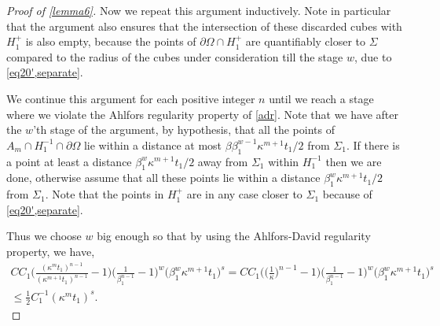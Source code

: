 \documentclass{article}
\newcounter{lem}
\theoremstyle{plain}
\theoremstyle{plain}
\theoremstyle{definition}
\theoremstyle{plain}
\begin{document}
\begin{proof}[Proof of \cref{lemma6}]




Now we repeat this argument inductively. Note in particular that the argument also ensures that the intersection of these discarded cubes with $H^{+}_1$ is also empty, because the points of $\partial\Omega\cap H^{+}_1$ are quantifiably closer to $\Sigma$ compared to the radius of the cubes under consideration till the stage $w$, due to \cref{eq20',separate}.

We continue this argument for each positive integer $n$ until we reach a stage where we violate the Ahlfors regularity property of \cref{adr}. Note that we have after the $w$'th stage of the argument, by hypothesis, that all the points of $A_m\cap H^{-1}_1\cap \partial\Omega$ lie within a distance at most $\beta \beta_1^{w-1}\kappa^{m+1} t_1/2$ from $\Sigma_1$. If there is a point at least a distance $ \beta_1^{w}\kappa^{m+1} t_1/2$ away from $\Sigma_1$ within $H^{-1}_{1}$ then we are done, otherwise assume that all these points lie within a distance $ \beta_1^{w}\kappa^{m+1} t_1/2$ from $\Sigma_1$. Note that the points in $H^{+}_{1}$ are in any case closer to $\Sigma_1$ because of \cref{eq20',separate}.


Thus we choose $w$ big enough so that by using the Ahlfors-David regularity property, we have,
\begin{multline}\label{eq20}
    CC_1\Big(\frac{(\kappa^{m}t_1)^{n-1}}{(\kappa^{m+1}t_1)^{n-1}}-1\Big) \Big(\frac{1}{\beta_1^{n-1}}-1\Big)^w\Big( \beta_1^w \kappa^{m+1} t_1 \Big)^{s}=  CC_1\Big(\Big(\frac{1}{\kappa}\Big)^{n-1}-1\Big) \Big(\frac{1}{\beta_1^{n-1}}-1\Big)^w\Big( \beta_1^w \kappa^{m+1} t_1 \Big)^{s}\\ \leq \frac{1}{2}C_{1}^{{-1}} (\kappa^{m} t_1)^s.
\end{multline}


\end{proof}
\end{document}
